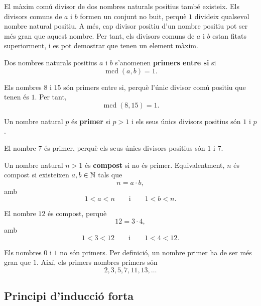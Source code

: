 \begin{observacio}
El màxim comú divisor de dos nombres naturals positius també existeix. Els divisors comuns de $a$ i $b$ formen un conjunt no buit, perquè $1$ divideix qualsevol nombre natural positiu. A més, cap divisor positiu d'un nombre positiu pot ser més gran que aquest nombre. Per tant, els divisors comuns de $a$ i $b$ estan fitats superiorment, i es pot demostrar que tenen un element màxim.
\end{observacio}

\begin{definicio}
Dos nombres naturals positius $a$ i $b$ s'anomenen \textbf{primers entre si} si
\[
\operatorname{mcd}(a,b)=1.
\]
\end{definicio}

\begin{exemple}
Els nombres $8$ i $15$ són primers entre si, perquè l'únic divisor comú positiu que tenen és $1$. Per tant,
\[
\operatorname{mcd}(8,15)=1.
\]
\end{exemple}

\begin{definicio}
Un nombre natural $p$ és \textbf{primer} si $p>1$ i els seus únics divisors positius són $1$ i $p$.
\end{definicio}

\begin{exemple}
El nombre $7$ és primer, perquè els seus únics divisors positius són $1$ i $7$.
\end{exemple}

\begin{definicio}
Un nombre natural $n>1$ és \textbf{compost} si no és primer. Equivalentment, $n$ és compost si existeixen $a,b\in\mathbb{N}$ tals que
\[
n=a\cdot b,
\]
amb
\[
1<a<n
\qquad\text{i}\qquad
1<b<n.
\]
\end{definicio}

\begin{exemple}
El nombre $12$ és compost, perquè
\[
12=3\cdot 4,
\]
amb
\[
1<3<12
\qquad\text{i}\qquad
1<4<12.
\]
\end{exemple}

\begin{observacio}
Els nombres $0$ i $1$ no són primers. Per definició, un nombre primer ha de ser més gran que $1$. Així, els primers nombres primers són
\[
2,3,5,7,11,13,\ldots
\]
\end{observacio}


\subsection{Principi d'inducció forta}

